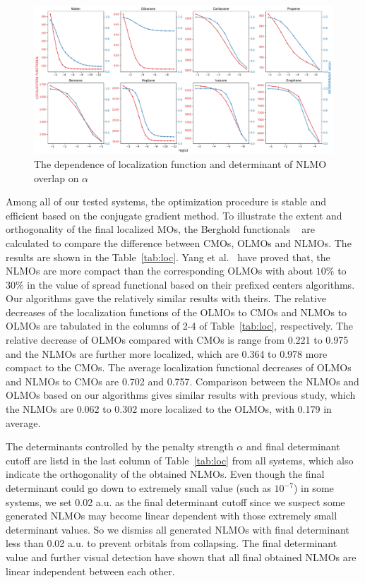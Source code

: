 \documentclass[aps,prl,reprint,amsmath,amssymb]{revtex4-1}
\begin{document}
\begin{figure}[hbpt]
\centering
\includegraphics[width=\textwidth]{figure_2.pdf}
\caption{The dependence of localization function and determinant of NLMO overlap on $\alpha$}
\label{fig:alpha}
\end{figure}


Among all of our tested systems, the optimization procedure is stable and efficient based on the conjugate gradient method. 
To illustrate the extent and orthogonality of the final localized MOs, the Berghold functionals ~\cite{berghold2000general}  are calculated to compare the difference between CMOs, OLMOs and NLMOs.
The results are shown in the Table~\ref{tab:loc}.
Yang et al.~\cite{feng2004An_efficient, cui2010efficient} have proved that, the NLMOs are more compact than the corresponding OLMOs with about $10\%$ to $30\%$ in the value of spread functional based on their prefixed centers algorithms.
Our algorithms gave the relatively similar results with theirs.
The relative decreases of the localization functions of the OLMOs to CMOs and NLMOs to OLMOs are tabulated in the columns of 2-4 of Table~\ref{tab:loc}, respectively.
The relative decrease of OLMOs compared with CMOs is range from 0.221 to 0.975 and the NLMOs are further  more localized, which are 0.364 to 0.978 more compact to the CMOs.
The average  localization functional decreases of OLMOs and NLMOs to CMOs are 0.702 and 0.757.
Comparison between the NLMOs and OLMOs based on our algorithms gives similar results with previous study, which the NLMOs are 0.062 to 0.302 more localized to the OLMOs, with 0.179 in average.


The determinants controlled by the penalty strength $\alpha$ and final determinant cutoff are listd in the last column of Table~\ref{tab:loc} from all systems, which also indicate the orthogonality of the obtained NLMOs.
Even though the final determinant could go down to extremely small value (such as $10^{-7}$) in some systems, we set 0.02 a.u. as the final determinant cutoff since we suspect some generated NLMOs may become linear dependent with those extremely small determinant values.
So we dismiss all generated NLMOs with final determinant less than 0.02 a.u. to prevent orbitals from collapsing.
The final determinant value and further visual detection have shown that all final obtained NLMOs are linear independent between each other.
\end{document}
